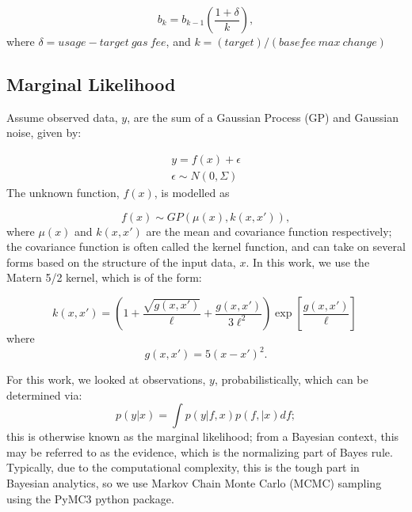 \documentclass[peerreview]{ieeesyscoin}
\begin{document}
\begin{equation}
b_{k} = b_{k-1}\left(\dfrac{1+ \delta}{k}\right), 
\end{equation}
where $\delta = usage - target~gas~fee$, and $k = (target)/(basefee~max~change)$


\subsection{Marginal Likelihood}

Assume observed data, $y$, are the sum of a Gaussian Process (GP) and Gaussian noise, given by:

\begin{eqnarray}
y = f(x) + \epsilon \\
\epsilon \sim N(0,\Sigma) 
\end{eqnarray}
The unknown function, $f(x)$, is modelled as

\begin{equation}
f(x) \sim GP(\mu(x), k(x,x')),
\end{equation}
where $\mu(x)$ and $k(x,x')$ are the mean and covariance function respectively; the covariance function is often called the kernel function, and can take on several forms based on the structure of the input data, $x$. In this work, we use the Matern 5/2 kernel, which is of the form:

\begin{equation}
k(x,x') = \left( 1 + \dfrac{\sqrt{g(x,x')}}{\ell} + \dfrac{g(x,x')}{3\ell^2}\right)\exp\left[ \dfrac{g(x,x')}{\ell} \right]\ 
\end{equation}
where
\begin{equation}
	g(x,x') = 5(x-x')^2.
\end{equation}

For this work, we looked at observations, $y$, probabilistically, which can be determined via:
\begin{equation}
p(y|x) = \int p(y | f,x) p (f, |x) df;
\end{equation}
this is otherwise known as the marginal likelihood; from a Bayesian context, this may be referred to as the evidence, which is the normalizing part of Bayes rule. Typically, due to the computational complexity, this is the tough part in Bayesian analytics, so we use Markov Chain Monte Carlo (MCMC) sampling using the PyMC3 python package.  
\end{document}
